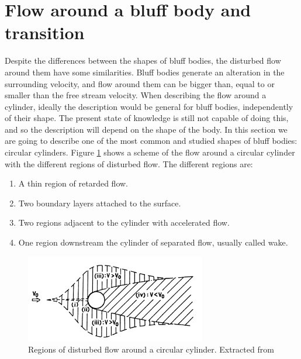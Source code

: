 \documentclass[journal]{new-aiaa}
\begin{document}
\clearpage

\section{Flow around a bluff body and transition}

Despite the differences between the shapes of bluff bodies, the disturbed flow around them have some similarities. Bluff bodies generate an alteration in the surrounding velocity, and flow around them can be bigger than, equal to or smaller than the free stream velocity. When describing the flow around a cylinder, ideally  the description would be general for bluff bodies, independently of their shape. The present state of knowledge is still not capable of doing this, and so the description will depend on the shape of the body. In this section we are going to describe one of the most common and studied shapes of bluff bodies: circular cylinders. Figure \ref{fig:RegionsFlow} shows a scheme of the flow around a circular cylinder with the different regions of disturbed flow. The different regions are:

\begin{enumerate}[label=(\roman*)]
\item A thin region of retarded flow.
\item Two boundary layers attached to the surface.
\item Two regions adjacent to the cylinder with accelerated flow.
\item One region downstream the cylinder of separated flow, usually called wake.
\end{enumerate}

\begin{figure}[H]
\begin{center}
\includegraphics[width=0.7\textwidth]{Images/federico/Figure01}
\caption{ Regions of disturbed flow around a circular cylinder. Extracted from \cite{Zdravkovich1997} }
\label{fig:RegionsFlow}
\end{center}
\end{figure}
\end{document}
